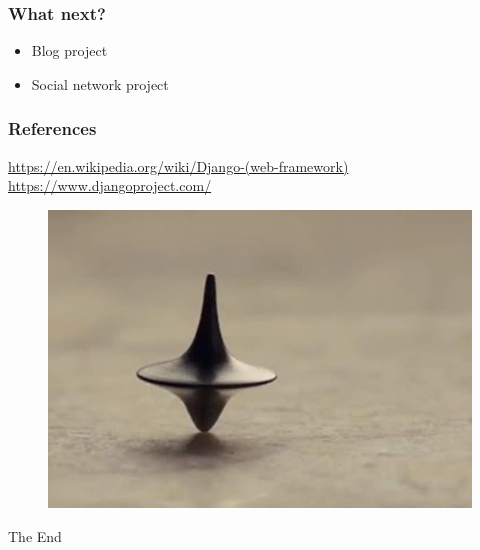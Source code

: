 \documentclass{beamer}
\begin{document}
\begin{frame}
	\frametitle{What next?}
	\begin{itemize}
		\centering
		\large
		\item Blog project
		\item Social network project
	\end{itemize}
\end{frame}

\begin{frame}
\frametitle{References}
	\href{https://en.wikipedia.org/wiki/Django_(web_framework)}{https://en.wikipedia.org/wiki/Django-(web-framework)}
	\href{https://www.djangoproject.com/}{https://www.djangoproject.com/}
\end{frame}

\begin{frame}
\begin{figure}
	\includegraphics[width=0.8\linewidth]{Pics/end.jpg}
\end{figure}

\Huge
\centering
The End
\end{frame}
\end{document}
